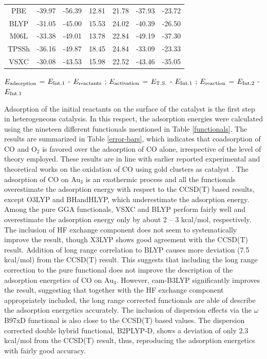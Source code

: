 \begin{table}[!t]
\begin{small}
\begin{adjustbox}{max width=0.49\textwidth}
\begin{tabular}{|c|cc|cc|cc|}
PBE&-39.97&-56.39&12.81&21.78&-37.93&-23.72\\
BLYP&-31.05&-45.00&15.53&24.02&-40.39&-26.50\\
 M06L&-33.38&-49.01&13.78&22.84&-49.19&-37.30\\
TPSSh&-36.16&-49.87&18.45&24.84&-33.09&-23.33\\
VSXC&-30.08&-43.53&15.98&22.52&-43.46&-35.05\\
\hline
\end{tabular}
\end{adjustbox}
\end{small}
\begin{flushleft}
$E_{\rm{adsorption}}$ = $E_{\rm{Int.1}}$ - $E_{\rm{reactants}}$ ; $E_{\rm{activation}}$ = $E_{\rm{T.S.}}$ - $E_{\rm{Int.1}}$ ; $E_{\rm{reaction}}$ = $E_{\rm{Int.2}}$ - $E_{\rm{Int.1}}$
\end{flushleft}
\end{table}
Adsorption of the initial reactants on the surface of the catalyst is the first step in heterogeneous catalysis. In this respect, the adsorption energies were calculated using the nineteen different functionals mentioned in Table \ref{functionals}. The results are summarized in Table \ref{error-bars}, which indicates that coadsorption of CO and O$_2$ is favored over the adsorption of CO alone, irrespective of the level of theory employed. These results are in line with earlier reported experimental and theoretical works on the oxidation of CO using gold clusters as catalyst \cite{Olga2010,ping2010}. The adsorption of CO on Au$_3$ is an exothermic process and all the functionals overestimate the adsorption energy with respect to the CCSD(T) based results, except O3LYP and BHandHLYP, which underestimate the adsorption energy. Among the pure GGA functionals, VSXC and BLYP perform fairly well and overestimate the adsorption energy only by about 2 -- 3 kcal/mol, respectively. The inclusion of HF exchange component does not seem to systematically improve the result, though X3LYP shows good agreement with the CCSD(T) result. Addition of long range correlation to BLYP causes more deviation (7.5 kcal/mol) from the CCSD(T) result. This suggests that including the long range correction to the pure functional does not improve the description of the adsorption energetics of CO on Au$_3$. However, cam-B3LYP significantly improves the result, suggesting that together with the HF exchange component appropriately included, the long range corrected functionals are able of describe the adsorption energetics accurately. The inclusion of dispersion effects via the $\omega$B97xD functional is also close to the CCSD(T) based values. The dispersion corrected double hybrid functional, B2PLYP-D, shows a deviation of only 2.3 kcal/mol from the CCSD(T) result, thus, reproducing the adsorption energetics with fairly good accuracy. \\
